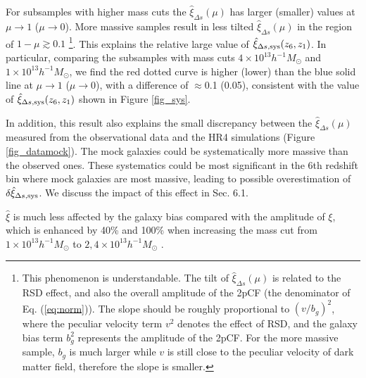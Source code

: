 \documentclass[iop]{emulateapj}
\begin{document}
For subsamples with higher mass cuts the $\hat\xi_{\Delta s}(\mu)$
has larger (smaller) values at $\mu\rightarrow1$ ($\mu\rightarrow0$).
More massive samples result in less tilted $\hat\xi_{\Delta s}(\mu)$ in the region of $1-\mu\gtrsim0.1$
\footnote{This phenomenon is understandable.
The tilt of $\hat\xi_{\Delta s}(\mu)$ is related to the RSD effect, 
and also the overall amplitude of the 2pCF (the denominator of Eq. (\ref{eq:norm})).
The slope should be roughly proportional to $(v/b_g)^2$, 
where the peculiar velocity term $v^2$ denotes the effect of RSD, 
and the galaxy bias term $b_g^2$ represents the amplitude of the 2pCF. 
For the more massive sample, $b_g$ is much larger while $v$ is still close to the peculiar velocity of dark matter field,
therefore the slope is smaller.
}.
This explains the relative large value of $\hat \xi_{\Delta s,\rm sys}(z_6, z_1)$.
In particular, comparing the subsamples with mass cuts $4\times 10^{13}h^{-1} M_{\odot}$ and $1\times 10^{13}h^{-1} M_{\odot}$, 
we find the red dotted curve is higher (lower) than the blue solid line at $\mu\rightarrow1$ ($\mu\rightarrow0$),
with a difference of $\approx$0.1 (0.05),
consistent with the value of $\hat \xi_{\Delta s,\rm sys}(z_6, z_1)$ shown in Figure \ref{fig_sys}.

In addition, this result also explains the small discrepancy between the $\hat\xi_{\Delta s}(\mu)$ measured from the 
observational data and the HR4 simulations (Figure \ref{fig_datamock}).
The mock galaxies could be systematically more massive than the observed ones.
These systematics could be most significant in the 6th redshift bin
where mock galaxies are most massive, 
leading to possible overestimation of $\delta\hat\xi_{\Delta s,{\rm sys}}$.
We discuss the impact of this effect in Sec. 6.1.

$\hat\xi$ is much less affected by the galaxy bias compared with the amplitude of $\xi$,
which is enhanced by 40\% and 100\% when increasing the mass cut from $1\times 10^{13}h^{-1} M_{\odot}$ to $2,4\times 10^{13}h^{-1} M_{\odot}$ .





\end{document}
